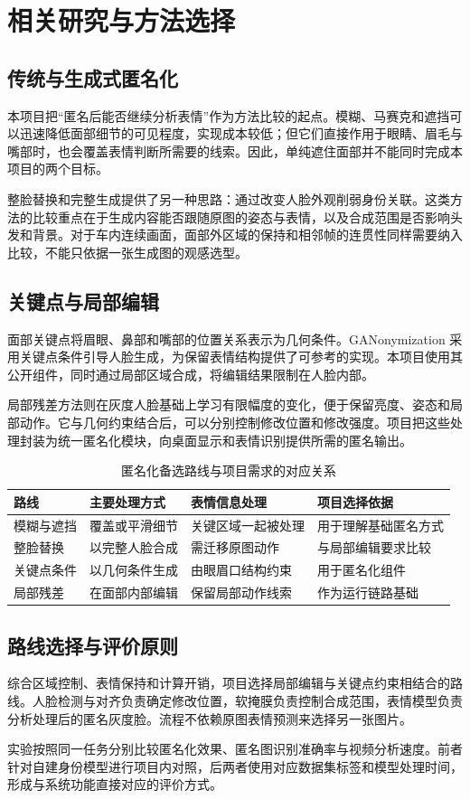 \section{相关研究与方法选择}
\label{sec:related}
\subsection{传统与生成式匿名化}
本项目把“匿名后能否继续分析表情”作为方法比较的起点。模糊、马赛克和遮挡可以迅速降低面部细节的可见程度，实现成本较低；但它们直接作用于眼睛、眉毛与嘴部时，也会覆盖表情判断所需要的线索。因此，单纯遮住面部并不能同时完成本项目的两个目标。

整脸替换和完整生成提供了另一种思路：通过改变人脸外观削弱身份关联。这类方法的比较重点在于生成内容能否跟随原图的姿态与表情，以及合成范围是否影响头发和背景。对于车内连续画面，面部外区域的保持和相邻帧的连贯性同样需要纳入比较，不能只依据一张生成图的观感选型。

\subsection{关键点与局部编辑}
面部关键点将眉眼、鼻部和嘴部的位置关系表示为几何条件。GANonymization 采用关键点条件引导人脸生成，为保留表情结构提供了可参考的实现\cite{ganonymization}。本项目使用其公开组件，同时通过局部区域合成，将编辑结果限制在人脸内部。

局部残差方法则在灰度人脸基础上学习有限幅度的变化，便于保留亮度、姿态和局部动作。它与几何约束结合后，可以分别控制修改位置和修改强度。项目把这些处理封装为统一匿名化模块，向桌面显示和表情识别提供所需的匿名输出。

\begin{table}[htbp]
\centering
\caption{匿名化备选路线与项目需求的对应关系}
\label{tab:method_compare}
\begin{tabularx}{\linewidth}{@{}lXXX@{}}
\toprule
路线 & 主要处理方式 & 表情信息处理 & 项目选择依据\\
\midrule
模糊与遮挡 & 覆盖或平滑细节 & 关键区域一起被处理 & 用于理解基础匿名方式\\
整脸替换 & 以完整人脸合成 & 需迁移原图动作 & 与局部编辑要求比较\\
关键点条件 & 以几何条件生成 & 由眼眉口结构约束 & 用于匿名化组件\\
局部残差 & 在面部内部编辑 & 保留局部动作线索 & 作为运行链路基础\\
\bottomrule
\end{tabularx}
\end{table}

\subsection{路线选择与评价原则}
综合区域控制、表情保持和计算开销，项目选择局部编辑与关键点约束相结合的路线。人脸检测与对齐负责确定修改位置，软掩膜负责控制合成范围，表情模型负责分析处理后的匿名灰度脸。流程不依赖原图表情预测来选择另一张图片。

实验按照同一任务分别比较匿名化效果、匿名图识别准确率与视频分析速度。前者针对自建身份模型进行项目内对照，后两者使用对应数据集标签和模型处理时间，形成与系统功能直接对应的评价方式。
